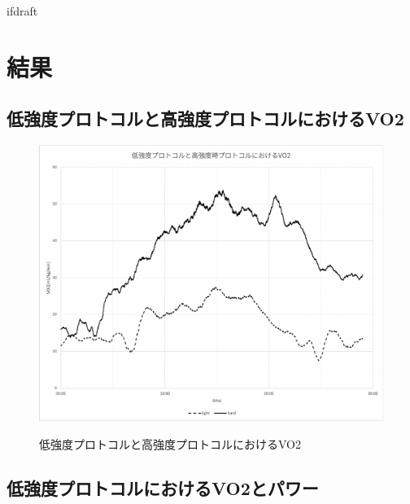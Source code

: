 \expandafter\ifx\csname ifdraft\endcsname\relax
 
\fi

\section{結果}

\subsection{低強度プロトコルと高強度プロトコルにおけるVO2}

\begin{figure}[H]
  \begin{center}
    \label{fig:light_hard_vo2}
    \includegraphics[width=12cm]{fig/light_hard_vo2}
    \caption{低強度プロトコルと高強度プロトコルにおけるVO2}
  \end{center}
\end{figure}

\subsection{低強度プロトコルにおけるVO2とパワー}

